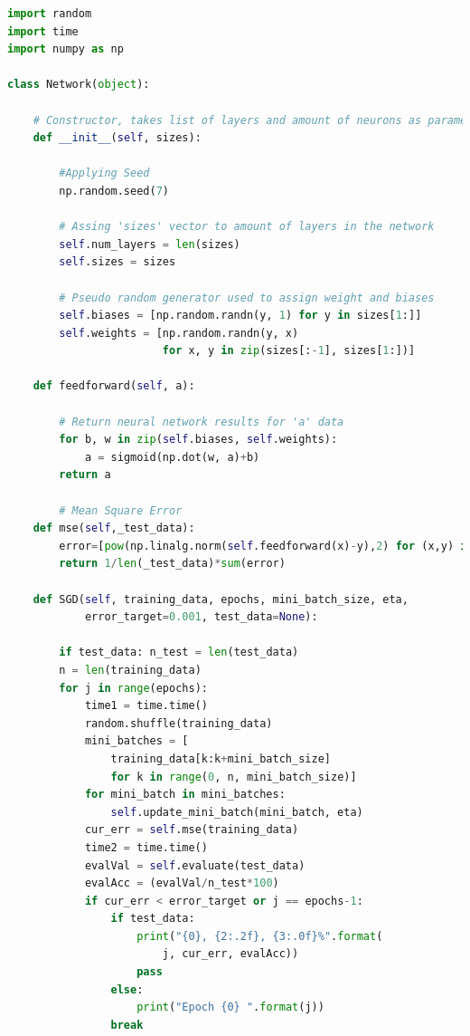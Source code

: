 \documentclass[12pt,twoside]{article}
\begin{document}
\begin{lstlisting}[caption={Plik zawierający sieć - network.py},label={Lst:network_py},language=Python,basicstyle=\scriptsize]
import random
import time
import numpy as np

class Network(object):

    # Constructor, takes list of layers and amount of neurons as parameter
    def __init__(self, sizes):

        #Applying Seed
        np.random.seed(7)

        # Assing 'sizes' vector to amount of layers in the network
        self.num_layers = len(sizes)
        self.sizes = sizes

        # Pseudo random generator used to assign weight and biases 
        self.biases = [np.random.randn(y, 1) for y in sizes[1:]]
        self.weights = [np.random.randn(y, x)
                        for x, y in zip(sizes[:-1], sizes[1:])]

    def feedforward(self, a):

        # Return neural network results for 'a' data
        for b, w in zip(self.biases, self.weights):
            a = sigmoid(np.dot(w, a)+b)
        return a

        # Mean Square Error
    def mse(self,_test_data):
        error=[pow(np.linalg.norm(self.feedforward(x)-y),2) for (x,y) in _test_data]
        return 1/len(_test_data)*sum(error)

    def SGD(self, training_data, epochs, mini_batch_size, eta,
            error_target=0.001, test_data=None):

        if test_data: n_test = len(test_data)
        n = len(training_data)
        for j in range(epochs):
            time1 = time.time()
            random.shuffle(training_data)
            mini_batches = [
                training_data[k:k+mini_batch_size]
                for k in range(0, n, mini_batch_size)]
            for mini_batch in mini_batches:
                self.update_mini_batch(mini_batch, eta)
            cur_err = self.mse(training_data)
            time2 = time.time()
            evalVal = self.evaluate(test_data)
            evalAcc = (evalVal/n_test*100)
            if cur_err < error_target or j == epochs-1:
                if test_data:
                    print("{0}, {2:.2f}, {3:.0f}%".format(
                        j, cur_err, evalAcc))
                    pass
                else:
                    print("Epoch {0} ".format(j))
                break


\end{lstlisting}
\end{document}
